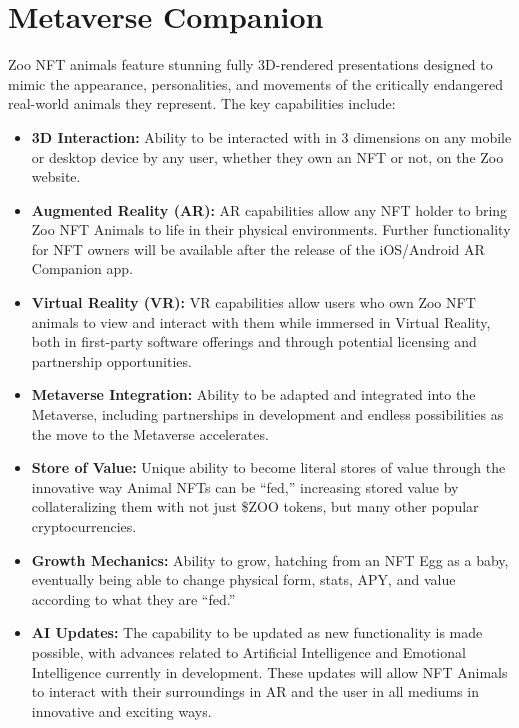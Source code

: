 \section{Metaverse Companion}

Zoo NFT animals feature stunning fully 3D-rendered presentations designed to mimic the appearance, personalities, and movements of the critically endangered real-world animals they represent. The key capabilities include:

\begin{itemize}[nosep]
\item \textbf{3D Interaction:} Ability to be interacted with in 3 dimensions on any mobile or desktop device by any user, whether they own an NFT or not, on the Zoo website.

\item \textbf{Augmented Reality (AR):} AR capabilities allow any NFT holder to bring Zoo NFT Animals to life in their physical environments. Further functionality for NFT owners will be available after the release of the iOS/Android AR Companion app.

\item \textbf{Virtual Reality (VR):} VR capabilities allow users who own Zoo NFT animals to view and interact with them while immersed in Virtual Reality, both in first-party software offerings and through potential licensing and partnership opportunities.

\item \textbf{Metaverse Integration:} Ability to be adapted and integrated into the Metaverse, including partnerships in development and endless possibilities as the move to the Metaverse accelerates.

\item \textbf{Store of Value:} Unique ability to become literal stores of value through the innovative way Animal NFTs can be ``fed,'' increasing stored value by collateralizing them with not just \$ZOO tokens, but many other popular cryptocurrencies.

\item \textbf{Growth Mechanics:} Ability to grow, hatching from an NFT Egg as a baby, eventually being able to change physical form, stats, APY, and value according to what they are ``fed.''

\item \textbf{AI Updates:} The capability to be updated as new functionality is made possible, with advances related to Artificial Intelligence and Emotional Intelligence currently in development. These updates will allow NFT Animals to interact with their surroundings in AR and the user in all mediums in innovative and exciting ways.
\end{itemize}

